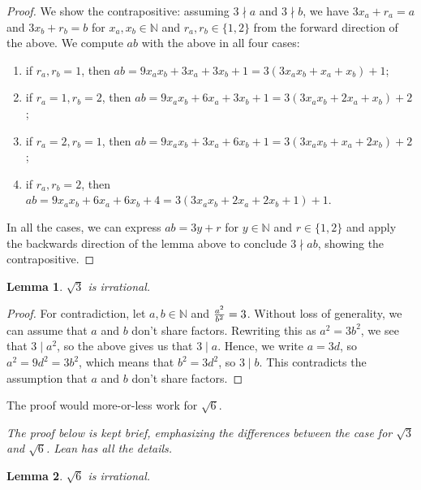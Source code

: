 \documentclass{article}
\newcommand{\N}{\mathbb{N}}
\newtheorem*{lemma}{Lemma}
\begin{document}
\begin{proof}
We show the contrapositive: assuming $3 \nmid a$ and $3 \nmid b$, we have $3x_a + r_a = a$ and
$3x_b + r_b = b$ for $x_a, x_b \in \N$ and $r_a, r_b \in \{1, 2\}$ from the forward direction of the above.
We compute $ab$ with the above in all four cases:
\begin{enumerate}
    \item if $r_a, r_b = 1$, then $ab = 9 x_a x_b + 3 x_a + 3 x_b + 1 = 3(3 x_a x_b + x_a + x_b) + 1$;
    \item if $r_a = 1, r_b = 2$, then $ab = 9 x_a x_b + 6 x_a + 3 x_b + 1 = 3(3 x_a x_b + 2 x_a + x_b) + 2$;
    \item if $r_a = 2, r_b = 1$, then $ab = 9 x_a x_b + 3 x_a + 6 x_b + 1 = 3(3 x_a x_b + x_a + 2 x_b) + 2$;
    \item if $r_a, r_b = 2$, then $ab = 9 x_a x_b + 6 x_a + 6 x_b + 4 = 3(3 x_a x_b + 2 x_a + 2 x_b + 1) + 1$.
\end{enumerate}
In all the cases, we can express $ab = 3y + r$ for $y \in \N$ and $r \in \{1, 2\}$ and apply the backwards direction of
the lemma above to conclude $3 \nmid ab$, showing the contrapositive.
\end{proof}

\begin{lemma}
$\sqrt{3}$ is irrational.
\end{lemma}

\begin{proof}
For contradiction, let $a, b \in \N$ and ${a^2 \over b^2} = 3$. Without loss of generality, we can assume that $a$ and $b$ don't
share factors. Rewriting this as $a^2 = 3 b^2$, we see that $3 \mid a^2$, so the above gives us that $3 \mid a$.
Hence, we write $a = 3d$, so $a^2 = 9 d^2 = 3 b^2$, which means that $b^2 = 3 d^2$, so $3 \mid b$. This contradicts the assumption
that $a$ and $b$ don't share factors.
\end{proof}

The proof would more-or-less work for $\sqrt{6}$.

\textit{The proof below is kept brief, emphasizing the differences between the case for $\sqrt{3}$ and $\sqrt{6}$. Lean has all the details.}

\begin{lemma}
$\sqrt{6}$ is irrational.
\end{lemma}
\end{document}
